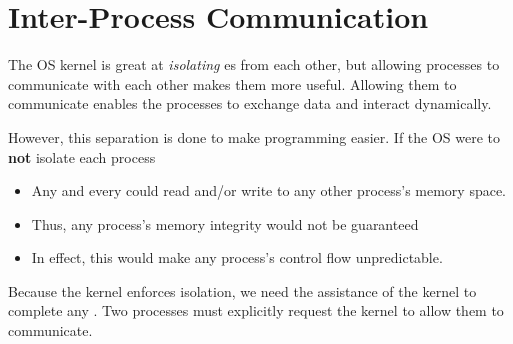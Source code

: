 \section{Inter-Process Communication}\label{sec:Inter_Process_Communication}
The OS kernel is great at \emph{isolating} es from each other, but allowing processes to communicate with each other makes them more useful.
Allowing them to communicate enables the processes to exchange data and interact dynamically.

However, this separation is done to make programming easier.
If the OS were to \textbf{not} isolate each process
\begin{itemize}[noitemsep]
\item Any and every  could read and/or write to any other process's memory space.
\item Thus, any process's memory integrity would not be guaranteed
\item In effect, this would make any process's control flow unpredictable.
\end{itemize}

Because the kernel enforces isolation, we need the assistance of the kernel to complete any .
Two processes must explicitly request the kernel to allow them to communicate.


